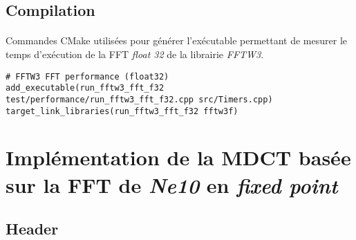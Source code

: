 \documentclass{article}
\begin{document}
\subsection{Compilation}\label{app:perf_fft_fftw3_cmake}
\paragraph{}
Commandes CMake utilisées pour générer l'exécutable permettant de mesurer le temps d'exécution de la FFT \emph{float 32} de la librairie \emph{FFTW3}.
\lstset{language=make}
\begin{lstlisting}
# FFTW3 FFT performance (float32)
add_executable(run_fftw3_fft_f32 test/performance/run_fftw3_fft_f32.cpp src/Timers.cpp)
target_link_libraries(run_fftw3_fft_f32 fftw3f)
\end{lstlisting}




\newpage
\section{Implémentation de la MDCT basée sur la FFT de \emph{Ne10} en \emph{fixed point}}\label{app:mdct_ne10_i32_c}
\subsection{Header}\label{app:mdct_ne10_i32_c_header}
\end{document}
